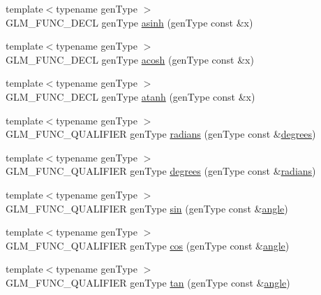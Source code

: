 \begin{DoxyCompactItemize}
\item 
{\footnotesize template$<$typename gen\+Type $>$ }\\G\+L\+M\+\_\+\+F\+U\+N\+C\+\_\+\+D\+E\+CL gen\+Type \hyperlink{group__core__func__trigonometric_gaa52acc1218a5ddd0f8d94fcd098685b1}{asinh} (gen\+Type const \&x)
\item 
{\footnotesize template$<$typename gen\+Type $>$ }\\G\+L\+M\+\_\+\+F\+U\+N\+C\+\_\+\+D\+E\+CL gen\+Type \hyperlink{group__core__func__trigonometric_ga961d72b4a20d09d6e71fdf076ad4f433}{acosh} (gen\+Type const \&x)
\item 
{\footnotesize template$<$typename gen\+Type $>$ }\\G\+L\+M\+\_\+\+F\+U\+N\+C\+\_\+\+D\+E\+CL gen\+Type \hyperlink{group__core__func__trigonometric_gaa20b78cb9c12e30bd5a3054b8cb3d099}{atanh} (gen\+Type const \&x)
\item 
{\footnotesize template$<$typename gen\+Type $>$ }\\G\+L\+M\+\_\+\+F\+U\+N\+C\+\_\+\+Q\+U\+A\+L\+I\+F\+I\+ER gen\+Type \hyperlink{group__core__func__trigonometric_ga431d31cdb060059bc5b0696e212f1453}{radians} (gen\+Type const \&\hyperlink{group__core__func__trigonometric_gaf4e5661bd1c993f6090d49e988a4c78a}{degrees})
\item 
{\footnotesize template$<$typename gen\+Type $>$ }\\G\+L\+M\+\_\+\+F\+U\+N\+C\+\_\+\+Q\+U\+A\+L\+I\+F\+I\+ER gen\+Type \hyperlink{group__core__func__trigonometric_gaf4e5661bd1c993f6090d49e988a4c78a}{degrees} (gen\+Type const \&\hyperlink{group__core__func__trigonometric_ga431d31cdb060059bc5b0696e212f1453}{radians})
\item 
{\footnotesize template$<$typename gen\+Type $>$ }\\G\+L\+M\+\_\+\+F\+U\+N\+C\+\_\+\+Q\+U\+A\+L\+I\+F\+I\+ER gen\+Type \hyperlink{group__core__func__trigonometric_gafbab21016b7f3bc21afb09a7e42e2df1}{sin} (gen\+Type const \&\hyperlink{group__gtc__quaternion_ga23a3fc7ada5bbb665ff84c92c6e0542c}{angle})
\item 
{\footnotesize template$<$typename gen\+Type $>$ }\\G\+L\+M\+\_\+\+F\+U\+N\+C\+\_\+\+Q\+U\+A\+L\+I\+F\+I\+ER gen\+Type \hyperlink{group__core__func__trigonometric_gac6708d4f0895dc79b65f50db00840167}{cos} (gen\+Type const \&\hyperlink{group__gtc__quaternion_ga23a3fc7ada5bbb665ff84c92c6e0542c}{angle})
\item 
{\footnotesize template$<$typename gen\+Type $>$ }\\G\+L\+M\+\_\+\+F\+U\+N\+C\+\_\+\+Q\+U\+A\+L\+I\+F\+I\+ER gen\+Type \hyperlink{group__core__func__trigonometric_ga328aeb0de4f312dc3d200cb929715d44}{tan} (gen\+Type const \&\hyperlink{group__gtc__quaternion_ga23a3fc7ada5bbb665ff84c92c6e0542c}{angle})

\end{DoxyCompactItemize}
